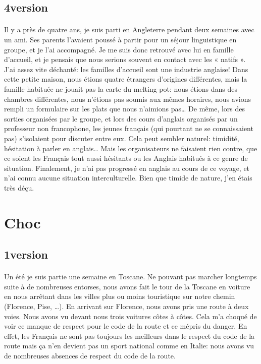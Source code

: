 \subsection{4\ieme version}

\paragraph{} Il y a près de quatre ans, je suis parti en Angleterre pendant
deux semaines avec un ami. Ses parents l'avaient poussé à partir pour un séjour
linguistique en groupe, et je l'ai accompagné. Je me suis donc retrouvé avec
lui en famille d'accueil, et je pensais que nous serions souvent en contact
avec les « natifs ». J'ai assez vite déchanté: les familles d'accueil sont une
industrie anglaise! Dans cette petite maison, nous étions quatre étrangers
d'origines différentes, mais la famille habituée ne jouait pas la carte du
melting-pot: nous étions dans des chambres différentes, nous n'étions pas
soumis aux mêmes horaires, nous avions rempli un formulaire sur les plats que
nous n'aimions pas… De même, lors des sorties organisées par le groupe, et lors
des cours d'anglais organisés par un professeur non francophone, les jeunes
français (qui pourtant ne se connaissaient pas) s'isolaient pour discuter entre
eux. Cela peut sembler naturel: timidité, hésitation à parler en anglais… Mais
les organisateurs ne faisaient rien contre, que ce soient les Français tout
aussi hésitants ou les Anglais habitués à ce genre de situation. Finalement, je
n'ai pas progressé en anglais au cours de ce voyage, et n'ai connu aucune
situation interculturelle. Bien que timide de nature, j'en étais très déçu.

\section{Choc}

\subsection{1\iere version}

\paragraph{} Un été je suis partie une semaine en Toscane. Ne pouvant pas
marcher longtemps suite à de nombreuses entorses, nous avons fait le tour de la
Toscane en voiture en nous arrêtant dans les villes plus ou moins touristique
sur notre chemin (Florence, Pise, …).  En arrivant sur Florence, nous avons
pris une route à deux voies. Nous avons vu devant nous trois voitures côtes à
côtes.  Cela m'a choqué de voir ce manque de respect pour le code de la route
et ce mépris du danger. En effet, les Français ne sont pas toujours les
meilleurs dans le respect du code de la route mais ça n'en devient pas un sport
national comme en Italie: nous avons vu de nombreuses absences de respect du
code de la route.

